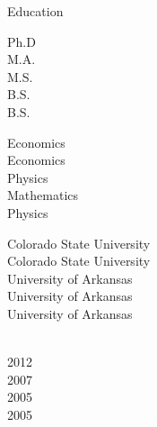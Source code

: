 \documentclass{standalone}
\begin{document}
\begin{rSection}{Education}
	\begin{minipage}{.1\textwidth}
		Ph.D\\
		M.A.\\
		M.S.\\
		B.S.\\
		B.S.
	\end{minipage}
	\begin{minipage}{.2\textwidth}
		Economics\\
		Economics\\
		Physics\\
		Mathematics\\
		Physics
	\end{minipage}
	\begin{minipage}{.3\textwidth}
		Colorado State University\\
		Colorado State University\\
		University of Arkansas\\
		University of Arkansas\\
		University of Arkansas
	\end{minipage}
	\begin{minipage}{.33\textwidth}
		\\
		2012\\
		2007\\
		2005\\
		2005
	\end{minipage}

\end{rSection}
\end{document}
